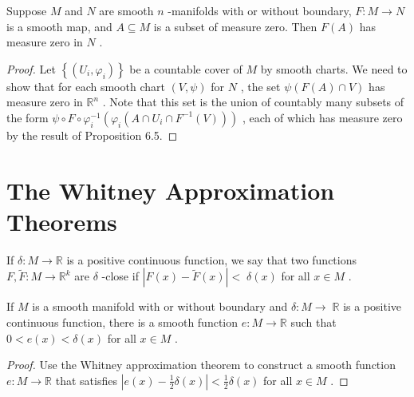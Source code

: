 \begin{theorem}
\label{thm:6-9}
\leanok
{}
Suppose $M$ and $N$ are smooth $n$ -manifolds with or without boundary, $F : M \rightarrow  N$ is a smooth map, and $A \subseteq  M$ is a subset of measure zero. Then $F\left( A\right)$ has measure zero in $N$ .
\end{theorem}

\begin{proof}
\leanok
Let $\left\{  \left( {{U}_{i},{\varphi }_{i}}\right) \right\}$ be a countable cover of $M$ by smooth charts. We need to show that for each smooth chart $\left( {V,\psi }\right)$ for $N$ , the set $\psi \left( {F\left( A\right)  \cap  V}\right)$ has measure zero in ${\mathbb{R}}^{n}$ . Note that this set is the union of countably many subsets of the form $\psi  \circ  F \circ  {\varphi }_{i}^{-1}\left( {{\varphi }_{i}\left( {A \cap  {U}_{i} \cap  {F}^{-1}\left( V\right) }\right) }\right)$ , each of which has measure zero by the result of Proposition 6.5.
\end{proof}


\section{The Whitney Approximation Theorems}

\begin{definition}
\label{def:6-41-extra-1}
\leanok
If $\delta  : M \rightarrow  \mathbb{R}$ is a positive continuous function, we say that two functions $F,\widetilde{F} : M \rightarrow  {\mathbb{R}}^{k}$ are $\delta$ -close if $\left| {F\left( x\right)  - \widetilde{F}\left( x\right) }\right|  < \; \delta \left( x\right)$ for all $x \in  M$ .
\end{definition}

\begin{corollary}
\label{cor:6-22}
\leanok
{}
If $M$ is a smooth manifold with or without boundary and $\delta  : M \rightarrow \; \mathbb{R}$ is a positive continuous function, there is a smooth function $e : M \rightarrow  \mathbb{R}$ such that $0 < e\left( x\right)  < \delta \left( x\right)$ for all $x \in  M$ .
\end{corollary}

\begin{proof}
\leanok
Use the Whitney approximation theorem to construct a smooth function $e : M \rightarrow  \mathbb{R}$ that satisfies $\left| {e\left( x\right)  - \frac{1}{2}\delta \left( x\right) }\right|  < \frac{1}{2}\delta \left( x\right)$ for all $x \in  M$ .
\end{proof}


